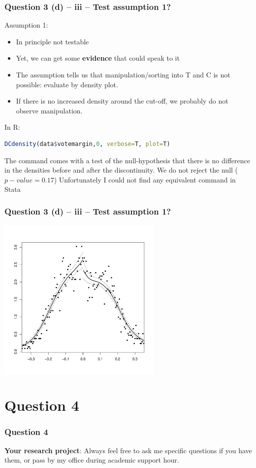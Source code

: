 \documentclass[xcolor=table,dvipsnames]{beamer}
\begin{document}
\begin{frame}[fragile]
\frametitle{Question 3 (d) -- iii -- Test assumption 1?} 
Assumption 1: \pause
\begin{itemize}
\item In principle not testable \pause 
\item Yet, we can get some \textbf{evidence} that could speak to it \pause 
\item The assumption tells us that manipulation/sorting into T and C is not possible: evaluate by density plot. \pause
\item If there is no increased density around the cut-off, we probably do not observe manipulation.
\end{itemize} \pause

In R: \pause
\begin{lstlisting}[language=R]
DCdensity(data$votemargin,0, verbose=T, plot=T)
\end{lstlisting} \pause

The command comes with a test of the null-hypothesis that there is no
difference in the densities before and after the discontinuity. We do not reject the null ($p-value = 0.17$) \pause Unfortunately I could not find any equivalent command in Stata
\end{frame}

\begin{frame}
\frametitle{Question 3 (d) -- iii -- Test assumption 1?}
\centering
\includegraphics[width=80mm]{pictures/week_22_ass1.pdf} 
\end{frame}

\section{Question 4}

\begin{frame}
\frametitle{Question 4}
\centering
\textbf{Your research project}: \pause Always feel free to ask me specific questions if you have them, or pass by my office during academic support hour.
\end{frame}

\end{document}
